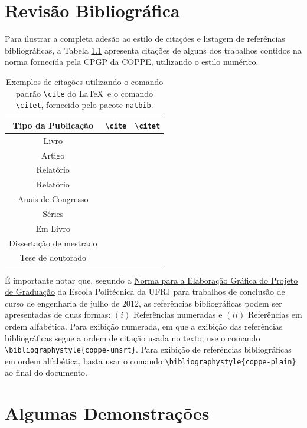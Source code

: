 \documentclass[grad,numbers]{coppe}
\begin{document}
  \chapter{Revisão Bibliográfica}

  Para ilustrar a completa adesão ao estilo de citações e listagem de
  referências bibliográficas, a Tabela \ref{tab:citation} apresenta citações de alguns dos trabalhos contidos na norma fornecida pela CPGP da
  COPPE, utilizando o estilo numérico.

  \begin{table}[h]
  \caption{Exemplos de citações utilizando o comando padrão
    \texttt{\textbackslash cite} do \LaTeX\ e
    o comando \texttt{\textbackslash citet},
    fornecido pelo pacote \texttt{natbib}.}
  \label{tab:citation}
  \centering
  {\footnotesize
  \begin{tabular}{|c|c|c|}
    \hline
    Tipo da Publicação & \verb|\cite| & \verb|\citet|\\
    \hline
    Livro & \cite{book-example} & \citet{book-example}\\
    Artigo & \cite{article-example} & \citet{article-example}\\
    Relatório & \cite{techreport-example} & \citet{techreport-example}\\
    Relatório & \cite{techreport-exampleIn} & \citet{techreport-exampleIn}\\
    Anais de Congresso & \cite{inproceedings-example} &
      \citet{inproceedings-example}\\
    Séries & \cite{incollection-example} & \citet{incollection-example}\\
    Em Livro & \cite{inbook-example} & \citet{inbook-example}\\
    Dissertação de mestrado & \cite{mastersthesis-example} &
      \citet{mastersthesis-example}\\
    Tese de doutorado & \cite{phdthesis-example} & \citet{phdthesis-example}\\
    \hline
  \end{tabular}}
  \end{table}
  
  É importante notar que, segundo a \href{http://www.poli.ufrj.br/graduacao_projeto.php}{Norma para a Elaboração Gráfica do Projeto de Graduação} da Escola Politécnica da UFRJ para trabalhos de conclusão de curso de engenharia de julho de 2012, as referências bibliográficas podem ser apresentadas de duas formas: $(i)$ Referências numeradas e $(ii)$ Referências em ordem alfabética. Para exibição numerada, em que a exibição das referências bibliográficas segue a ordem de citação usada no texto, use o comando \texttt{\textbackslash bibliographystyle\{coppe-unsrt\}}. Para exibição de referências bibliográficas em ordem alfabética, basta usar o comando \texttt{\textbackslash bibliographystyle\{coppe-plain\}} ao final do documento. 

  \backmatter
  
  

  \appendix
  \chapter{Algumas Demonstrações}
\end{document}
